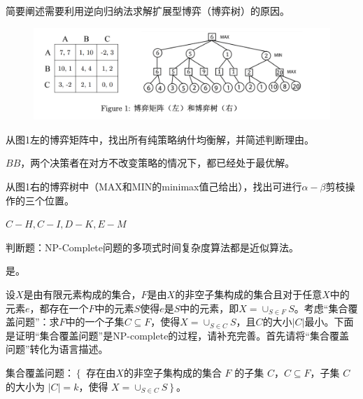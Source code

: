 \begin{problem}
	简要阐述需要利用逆向归纳法求解扩展型博弈（博弈树）的原因。
\end{problem}
\begin{solution}

\end{solution}

\begin{figure}[htbp]
	\centering
	\includegraphics[width=1\textwidth]{./figure/fig1.png}
  \end{figure}

\begin{problem}
	从图1左的博弈矩阵中，找出所有纯策略纳什均衡解，并简述判断理由。
\end{problem}
\begin{solution}
	$BB$，两个决策者在对方不改变策略的情况下，都已经处于最优解。
\end{solution}


\begin{problem}
	从图1右的博弈树中（MAX和MIN的minimax值己给出），找出可进行$\alpha-\beta$剪枝操作的三个位置。
\end{problem}
\begin{solution}
	$C-H,C-I,D-K,E-M$
\end{solution}


\begin{problem}
	判断题：NP-Complete问题的多项式时间复杂度算法都是近似算法。
\end{problem}
\begin{solution}
	是。
\end{solution}


\begin{problem}
	设$X$是由有限元素构成的集合，$F$是由$X$的非空子集构成的集合且对于任意$X$中的元素$e$，都存在一个$F$中的元素$S$使得$e$是$S$中的元素，即$X=\cup_{S\in F}S$。考虑“集合覆盖问题”：求$F$中的一个子集$C\subseteq F$，使得$X=\cup_{S\in C}S$，且$C$的大小$|C|$最小。下面是证明“集合覆盖问题”是NP-complete的过程，请补充完善。首先请将“集合覆盖问题”转化为语言描述。
\end{problem}
\begin{solution}
	集合覆盖问题：$\left\{\right.$ 存在由$X$的非空子集构成的集合 $F$ 的子集 $C$，$C \subseteq F$，子集 $C$ 的大小为 $|C|=k$，使得 $X=\cup_{S \in C} S$$\left.\right\}$。
\end{solution}


